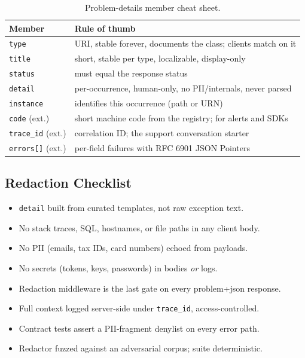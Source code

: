 \begin{table}[h]
  \centering
  \small
  \begin{tabularx}{\textwidth}{l X}
    \toprule
    \textbf{Member} & \textbf{Rule of thumb} \\
    \midrule
    \texttt{type} & URI, stable forever, documents the class; clients match on it \\
    \texttt{title} & short, stable per type, localizable, display-only \\
    \texttt{status} & must equal the response status \\
    \texttt{detail} & per-occurrence, human-only, no PII/internals, never parsed \\
    \texttt{instance} & identifies this occurrence (path or URN) \\
    \texttt{code} (ext.) & short machine code from the registry; for alerts and SDKs \\
    \texttt{trace\_id} (ext.) & correlation ID; the support conversation starter \\
    \texttt{errors[]} (ext.) & per-field failures with RFC 6901 JSON Pointers \\
    \bottomrule
  \end{tabularx}
  \caption{Problem-details member cheat sheet.}
\end{table}

\subsection*{Redaction Checklist}

\begin{itemize}
  \item[$\square$] \texttt{detail} built from curated templates, not raw exception text.
  \item[$\square$] No stack traces, SQL, hostnames, or file paths in any client body.
  \item[$\square$] No PII (emails, tax IDs, card numbers) echoed from payloads.
  \item[$\square$] No secrets (tokens, keys, passwords) in bodies \emph{or} logs.
  \item[$\square$] Redaction middleware is the last gate on every problem+json response.
  \item[$\square$] Full context logged server-side under \texttt{trace\_id}, access-controlled.
  \item[$\square$] Contract tests assert a PII-fragment denylist on every error path.
  \item[$\square$] Redactor fuzzed against an adversarial corpus; suite deterministic.
\end{itemize}


